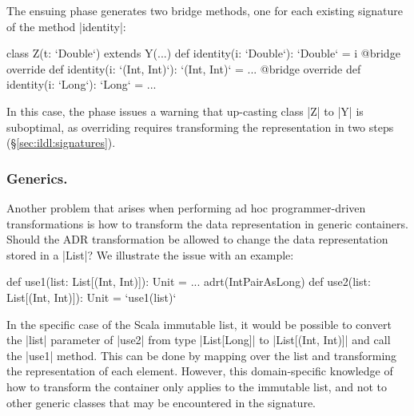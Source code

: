The ensuing \bridge{} phase generates two bridge methods, one for each existing signature of the method |identity|:

\begin{lstlisting-nobreak}
class Z(t: `Double`) extends Y(...) {
  def identity(i: `Double`): `Double` = i
  @bridge override def identity(i: `(Int, Int)`): `(Int, Int)` = ...
  @bridge override def identity(i: `Long`): `Long` = ...
}
\end{lstlisting-nobreak}


In this case, the \bridge{} phase issues a warning that up-casting class |Z| to |Y| is suboptimal, as overriding requires transforming the representation in two steps (\S\ref{sec:ildl:signatures}).


\subsubsection{Generics.}
Another problem that arises when performing ad hoc programmer-driven transformations is how to transform the data representation in generic containers. Should the ADR transformation be allowed to change the data representation stored in a |List|? We illustrate the issue with an example:

\begin{lstlisting-nobreak}
def use1(list: List[(Int, Int)]): Unit = ...
adrt(IntPairAsLong) {
  def use2(list: List[(Int, Int)]): Unit = `use1(list)`
}
\end{lstlisting-nobreak}

In the specific case of the Scala immutable list, it would be possible to convert the |list| parameter of |use2| from type |List[Long]| to |List[(Int, Int)]| and call the |use1| method. This can be done by mapping over the list and transforming the representation of each element. However, this domain-specific knowledge of how to transform the container only applies to the immutable list, and not to other generic classes that may be encountered in the signature.

